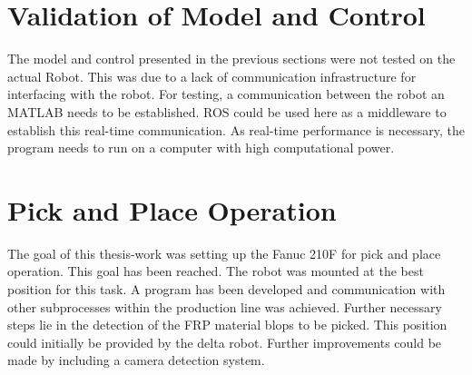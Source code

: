 \section{Validation of Model and Control}
The model and control presented in the previous sections were not tested on the actual Robot. This was due to a lack of communication infrastructure for interfacing with the robot. For testing, a communication between the robot an MATLAB needs to be established. \ac{ROS} could be used here as a middleware to establish this real-time communication. As real-time performance is necessary, the program needs to run on a computer with high computational power.\\

\section{Pick and Place Operation}
The goal of this thesis-work was setting up the Fanuc 210F for pick and place operation. This goal has been reached. The robot was mounted at the best position for this task. A program has been developed and communication with other subprocesses within the production line was achieved. 
Further necessary steps lie in the detection of the \ac{FRP} material blops to be picked. This position could initially be provided by the delta robot. Further improvements could be made by including a camera detection system.





